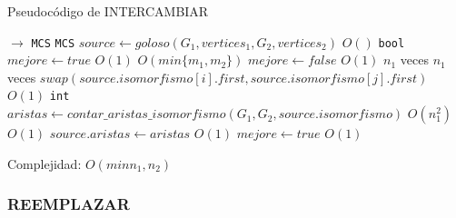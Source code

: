 \begin{algorithm}[H]
  \small
  \begin{algorithmic}[1]
  \caption{Pseudocódigo de INTERCAMBIAR}
  \label{algo:1-1}
    $\rightarrow$ \texttt{MCS}
      \State \texttt{MCS} $source \gets goloso(G_1, vertices_1, G_2, vertices_2)$
      \Comment $O()$
      \State \texttt{bool} $mejore \gets true$
      \Comment $O(1)$
      \Comment $O(min\{m_1, m_2\})$
        \State $mejore \gets false$
        \Comment $O(1)$
        \Comment $n_1$ veces
          \Comment $n_1$ veces
            \State $swap(source.isomorfismo[i].first, source.isomorfismo[j].first)$
            \Comment $O(1)$
            \State \texttt{int} $aristas \gets contar\_aristas\_isomorfismo(G_1, G_2, source.isomorfismo)$
            \Comment $O(n_1^2)$
            \Comment $O(1)$
              \State $source.aristas \gets aristas$ 
              \Comment $O(1)$             
              \State $mejore \gets true$
              \Comment $O(1)$
            \EndIf
          \EndFor
        \EndFor
      \EndWhile
    \EndProcedure
  \end{algorithmic}
  Complejidad: $O(min{n_1, n_2})$
\end{algorithm}

\subsubsection{REEMPLAZAR}

